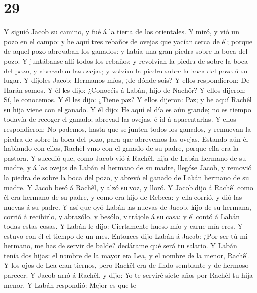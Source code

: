 \hypertarget{section-28}{%
\section{29}\label{section-28}}

 Y siguió Jacob su camino, y fué á la tierra de los
orientales.  Y miró, y vió un pozo en el campo: y he aquí
tres rebaños de ovejas que yacían cerca de él; porque de aquel pozo
abrevaban los ganados: y había una gran piedra sobre la boca del pozo.
 Y juntábanse allí todos los rebaños; y revolvían la piedra
de sobre la boca del pozo, y abrevaban las ovejas; y volvían la piedra
sobre la boca del pozo á su lugar.  Y díjoles Jacob:
Hermanos míos, ¿de dónde sois? Y ellos respondieron: De Harán somos.
 Y él les dijo: ¿Conocéis á Labán, hijo de Nachôr? Y ellos
dijeron: Sí, le conocemos.  Y él les dijo: ¿Tiene paz? Y
ellos dijeron: Paz; y he aquí Rachêl su hija viene con el ganado.
 Y él dijo: He aquí el día es aún grande; no es tiempo
todavía de recoger el ganado; abrevad las ovejas, é id á apacentarlas.
 Y ellos respondieron: No podemos, hasta que se junten todos
los ganados, y remuevan la piedra de sobre la boca del pozo, para que
abrevemos las ovejas.  Estando aún él hablando con ellos,
Rachêl vino con el ganado de su padre, porque ella era la pastora.
 Y sucedió que, como Jacob vió á Rachêl, hija de Labán
hermano de su madre, y á las ovejas de Labán el hermano de su madre,
llegóse Jacob, y removió la piedra de sobre la boca del pozo, y abrevó
el ganado de Labán hermano de su madre.  Y Jacob besó á
Rachêl, y alzó su voz, y lloró.  Y Jacob dijo á Rachêl como
él era hermano de su padre, y como era hijo de Rebeca: y ella corrió, y
dió las nuevas á su padre.  Y así que oyó Labán las nuevas
de Jacob, hijo de su hermana, corrió á recibirlo, y abrazólo, y besólo,
y trájole á su casa: y él contó á Labán todas estas cosas. 
Y Labán le dijo: Ciertamente hueso mío y carne mía eres. Y estuvo con él
el tiempo de un mes.  Entonces dijo Labán á Jacob: ¿Por ser
tú mi hermano, me has de servir de balde? declárame qué será tu salario.
 Y Labán tenía dos hijas: el nombre de la mayor era Lea, y
el nombre de la menor, Rachêl.  Y los ojos de Lea eran
tiernos, pero Rachêl era de lindo semblante y de hermoso parecer.
 Y Jacob amó á Rachêl, y dijo: Yo te serviré siete años por
Rachêl tu hija menor.  Y Labán respondió: Mejor es que te
